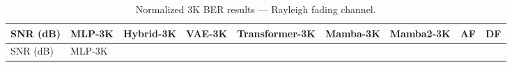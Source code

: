 \begin{longtable}[]{@{}
  >{\raggedright\arraybackslash}p{}
  >{\raggedright\arraybackslash}p{}
  >{\raggedright\arraybackslash}p{}
  >{\raggedright\arraybackslash}p{}
  >{\raggedright\arraybackslash}p{}
  >{\raggedright\arraybackslash}p{}
  >{\raggedright\arraybackslash}p{}
  >{\raggedright\arraybackslash}p{}
  >{\raggedright\arraybackslash}p{}@{}}
\caption{Normalized 3K BER results --- Rayleigh fading channel.}\label{tbl:table8}\tabularnewline
\toprule\noalign{}
\begin{minipage}[b]{\linewidth}\raggedright
SNR (dB)
\end{minipage} & \begin{minipage}[b]{\linewidth}\raggedright
MLP-3K
\end{minipage} & \begin{minipage}[b]{\linewidth}\raggedright
Hybrid-3K
\end{minipage} & \begin{minipage}[b]{\linewidth}\raggedright
VAE-3K
\end{minipage} & \begin{minipage}[b]{\linewidth}\raggedright
Transformer-3K
\end{minipage} & \begin{minipage}[b]{\linewidth}\raggedright
Mamba-3K
\end{minipage} & \begin{minipage}[b]{\linewidth}\raggedright
Mamba2-3K
\end{minipage} & \begin{minipage}[b]{\linewidth}\raggedright
AF
\end{minipage} & \begin{minipage}[b]{\linewidth}\raggedright
DF
\end{minipage} \\
\midrule\noalign{}
\endfirsthead
\toprule\noalign{}
\begin{minipage}[b]{\linewidth}\raggedright
SNR (dB)
\end{minipage} & \begin{minipage}[b]{\linewidth}\raggedright
MLP-3K
\end{minipage} & \begin{minipage}[b]{\linewidth}\raggedright

\end{minipage}
\end{longtable}
